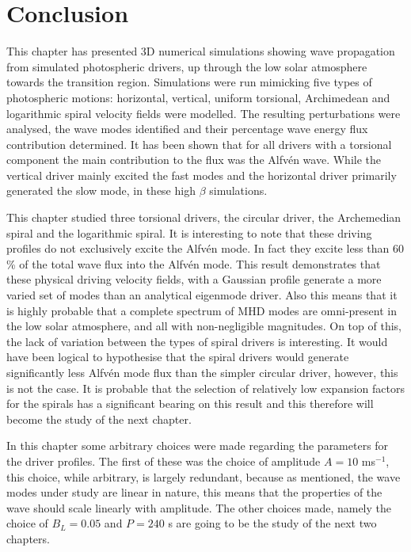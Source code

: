 \section{Conclusion}
This chapter has presented 3D numerical simulations showing wave propagation from simulated photospheric drivers, up through the low solar atmosphere towards the transition region.
Simulations were run mimicking five types of photospheric motions: horizontal, vertical, uniform torsional, Archimedean and logarithmic spiral velocity fields were modelled.
The resulting perturbations were analysed, the wave modes identified and their percentage wave energy flux contribution determined.
It has been shown that for all drivers with a torsional component the main contribution to the flux was the Alfv\'en wave.
While the vertical driver mainly excited the fast modes and the horizontal driver primarily generated the slow mode, in these high $\beta$ simulations.

This chapter studied three torsional drivers, the circular driver, the Archemedian spiral and the logarithmic spiral.
It is interesting to note that these driving profiles do not exclusively excite the Alfv\'en mode.
In fact they excite less than $60$ \% of the total wave flux into the Alfv\'en mode.
This result demonstrates that these physical driving velocity fields, with a Gaussian profile generate a more varied set of modes than an analytical eigenmode driver.
Also this means that it is highly probable that a complete spectrum of MHD modes are omni-present in the low solar atmosphere, and all with non-negligible magnitudes.
On top of this, the lack of variation between the types of spiral drivers is interesting.
It would have been logical to hypothesise that the spiral drivers would generate significantly less Alfv\'en mode flux than the simpler circular driver, however, this is not the case.
It is probable that the selection of relatively low expansion factors for the spirals has a significant bearing on this result and this therefore will become the study of the next chapter.

In this chapter some arbitrary choices were made regarding the parameters for the driver profiles.
The first of these was the choice of amplitude $A=10$ ms$^{-1}$, this choice, while arbitrary, is largely redundant, because as mentioned, the wave modes under study are linear in nature, this means that the properties of the wave should scale linearly with amplitude.
The other choices made, namely the choice of $B_L = 0.05$ and $P=240$ s are going to be the study of the next two chapters.
